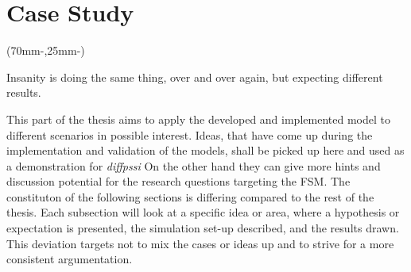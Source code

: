 


\chapter{Case Study}
\label{chap:case-study}

\begin{textblock*}{.7\textwidth}(70mm-\offset,25mm-\offset)
    \begin{fquote}
        Insanity is doing the same thing, over and over again, but expecting different results.
    \end{fquote}
\end{textblock*}

This part of the thesis aims to apply the developed and implemented model to different scenarios in possible interest.
Ideas, that have come up during the implementation and validation of the models, shall be picked up here and used as a demonstration for \textit{diffpssi}
On the other hand they can give more hints and discussion potential for the research questions targeting the \acs{FSM}.
The constituton of the following sections is differing compared to the rest of the thesis.
Each subsection will look at a specific idea or area, where a hypothesis or expectation is presented, the simulation set-up described, and the results drawn.
This deviation targets not to mix the cases or ideas up and to strive for a more consistent argumentation.



